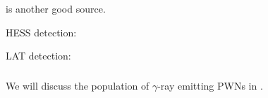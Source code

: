 \subsubsection{}

 is another good source.

\ac{HESS} detection: \cite{aharonian_2008a_very-high-energy-gamma-ray}

LAT detection: \cite{rousseau_2012_fermi-lat-constraints}

\subsubsection{}



We will discuss the population of $\gamma$-ray emitting \acp{PWN} in 
.
